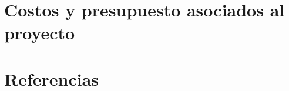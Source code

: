 \documentclass{report}
\begin{document}
    \chapter{Costos y presupuesto asociados al proyecto}
    
    \newpage
\chapter{Referencias}

\end{document}
